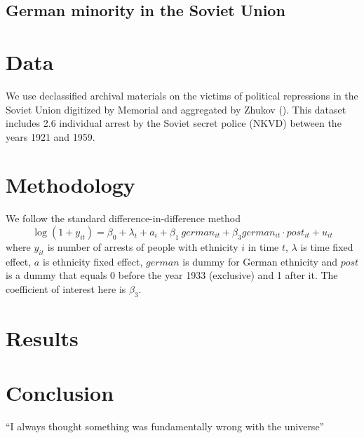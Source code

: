 \documentclass[12pt]{article}
\begin{document}
\subsection{German minority in the Soviet Union}
\section{Data}
We use declassified archival materials on the victims of political repressions in the Soviet Union digitized by Memorial and aggregated by Zhukov (). This dataset includes 2.6 individual arrest by the Soviet secret police (NKVD) between  the years 1921 and 1959.
\section{Methodology}
We follow the standard difference-in-difference method
$$ \log\left(1 + y_{it}\right) = \beta_0 +\lambda_t + a_i + \beta_1 \: german_{it} + \beta_3 german_{it} \cdot post_{it} + u_{it} $$
where $y_{it}$ is number of arrests of people with ethnicity $i$ in time $t$, $\lambda$ is time fixed effect, $a$ is ethnicity fixed effect, $german$ is dummy for German ethnicity and $post$ is a dummy that equals 0 before the year 1933 (exclusive) and 1 after it. The coefficient of interest here is $\beta_3$. 
\section{Results}

\section{Conclusion}
``I always thought something was fundamentally wrong with the universe'' \citep{adams1995hitchhiker}





\end{document}
